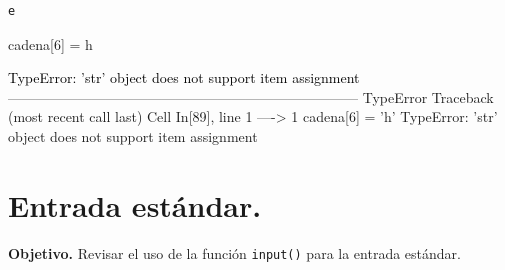 \documentclass[
  spanish,
  letterpaper,
]{scrbook}
\newenvironment{Shaded}{\begin{snugshade}}{\end{snugshade}}
\newcommand{\DecValTok}[1]{\textcolor[rgb]{0.68,0.00,0.00}{#1}}
\newcommand{\NormalTok}[1]{\textcolor[rgb]{0.00,0.23,0.31}{#1}}
\newcommand{\OperatorTok}[1]{\textcolor[rgb]{0.37,0.37,0.37}{#1}}
\newcommand{\StringTok}[1]{\textcolor[rgb]{0.13,0.47,0.30}{#1}}
\theoremstyle{definition}
\theoremstyle{remark}
\begin{document}
\begin{verbatim}
e
\end{verbatim}

\begin{Shaded}
\begin{Highlighting}[]
\NormalTok{cadena[}\DecValTok{6}\NormalTok{] }\OperatorTok{=} \StringTok{\textquotesingle{}h\textquotesingle{}}
\end{Highlighting}
\end{Shaded}

\begin{Highlighting}
\textcolor{black}{TypeError: 'str' object does not support item assignment}
\textcolor{black}{}\textcolor{QuartoInternalColor1}{---------------------------------------------------------------------------}\textcolor{QuartoInternalColor2}{}
\textcolor{QuartoInternalColor2}{}\textcolor{QuartoInternalColor1}{TypeError}\textcolor{QuartoInternalColor2}{                                 Traceback (most recent call last)}
\textcolor{QuartoInternalColor2}{}\textcolor{QuartoInternalColor3}{Cell}\textcolor{QuartoInternalColor2}{}\textcolor{QuartoInternalColor3}{ }\textcolor{QuartoInternalColor2}{}\textcolor{QuartoInternalColor4}{In[89]}\textcolor{QuartoInternalColor2}{}\textcolor{QuartoInternalColor4}{, line 1}\textcolor{QuartoInternalColor2}{}
\textcolor{QuartoInternalColor2}{}\textcolor{QuartoInternalColor4}{----> }\textcolor{QuartoInternalColor2}{}\textcolor{QuartoInternalColor4}{1}\textcolor{QuartoInternalColor2}{ }\textcolor{QuartoInternalColor2}{cadena}\textcolor{QuartoInternalColor2}{}\textcolor{QuartoInternalColor2}{[}\textcolor{QuartoInternalColor2}{}\textcolor{QuartoInternalColor2}{6}\textcolor{QuartoInternalColor2}{}\textcolor{QuartoInternalColor2}{]}\textcolor{QuartoInternalColor2}{ = }\textcolor{QuartoInternalColor6}{'}\textcolor{QuartoInternalColor2}{}\textcolor{QuartoInternalColor6}{h}\textcolor{QuartoInternalColor2}{}\textcolor{QuartoInternalColor6}{'}\textcolor{QuartoInternalColor2}{}
\textcolor{QuartoInternalColor2}{}\textcolor{QuartoInternalColor1}{TypeError}\textcolor{QuartoInternalColor2}{: 'str' object does not support item assignment}
\end{Highlighting}

\chapter{Entrada estándar.}\label{sec-f-entrada-estandar}

\textbf{Objetivo.} Revisar el uso de la función \texttt{input()} para la
entrada estándar.
\end{document}
